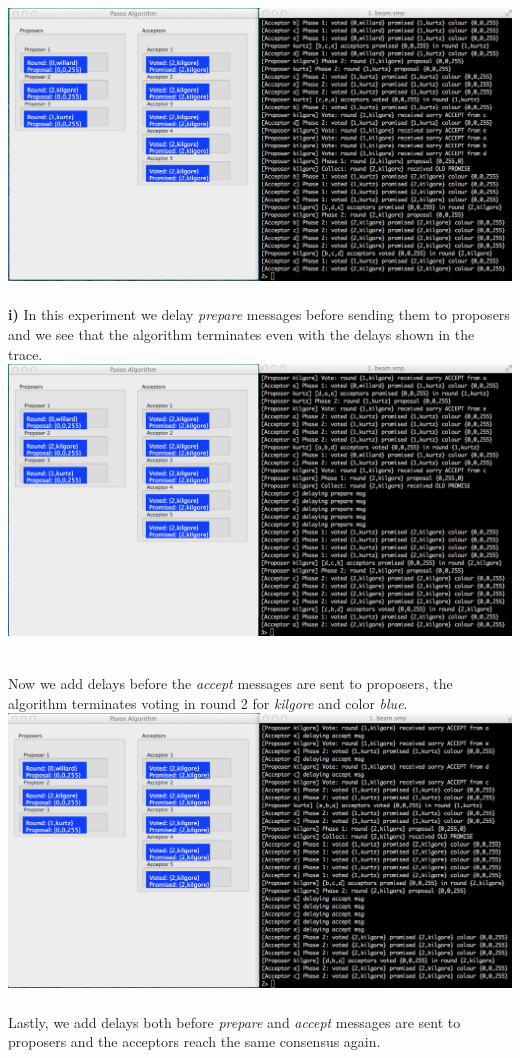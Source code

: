 \documentclass[a4paper, 11pt]{article}
\begin{document}
\includegraphics[scale=0.35]{images/exp0.png} \\\\

\textbf{i)} In this experiment we delay \textit{prepare} messages before sending them to proposers and we see that the algorithm terminates even with the delays shown in the trace.\\

\includegraphics[scale=0.35]{images/exp1.png} \\\\
\newpage

Now we add delays before the \textit{accept} messages are sent to proposers, the algorithm terminates voting in round 2 for \textit{kilgore} and color \textit{blue}.\\

\includegraphics[scale=0.35]{images/exp2.png} \\\\
Lastly, we add delays both before \textit{prepare} and \textit{accept} messages are sent to proposers and the acceptors reach the same consensus again.\\
\end{document}
